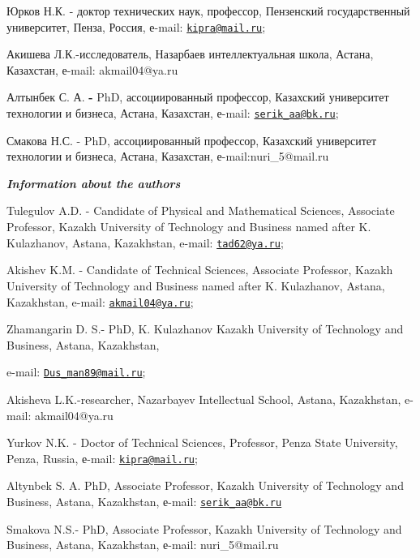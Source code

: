 Юрков Н.К. - доктор технических наук, профессор, Пензенский
государственный университет, Пенза, Россия, е-mail:
\href{mailto:kipra@mail.ru}{\nolinkurl{kipra@mail.ru}};

Акишева Л.К.-исследователь, Назарбаев интеллектуальная школа, Астана,
Казахстан, е-mail: akmail04@ya.ru

Алтынбек С. А. {\bfseries -} PhD, ассоциированный профессор, Казахский
университет технологии и бизнеса, Астана, Казахстан, е-mail:
\href{mailto:serik_aa@bk.ru}{\nolinkurl{serik\_aa@bk.ru}};

Смакова Н.С. - PhD, ассоциированный профессор, Казахский университет
технологии и бизнеса, Астана, Казахстан, е-mail:nuri\_5@mail.ru

\emph{{\bfseries Information about the authors}}

Tulegulov A.D. - Candidate of Physical and Mathematical Sciences,
Associate Professor, Kazakh University of Technology and Business named
after K. Kulazhanov, Astana, Kazakhstan, e-mail:
\href{mailto:tad62@ya.ru}{\nolinkurl{tad62@ya.ru}};

Akishev K.M. - Candidate of Technical Sciences, Associate Professor,
Kazakh University of Technology and Business named after K. Kulazhanov,
Astana, Kazakhstan, e-mail:
\href{mailto:akmail04@ya.ru}{\nolinkurl{akmail04@ya.ru}};

Zhamangarin D. S.- PhD, K. Kulazhanov Kazakh University of Technology
and Business, Astana, Kazakhstan,

e-mail: \href{mailto:Dus_man89@mail.ru}{\nolinkurl{Dus\_man89@mail.ru}};

Akisheva L.K.-researcher, Nazarbayev Intellectual School, Astana,
Kazakhstan, e-mail: akmail04@ya.ru

Yurkov N.K. - Doctor of Technical Sciences, Professor, Penza State
University, Penza, Russia, е-mail:
\href{mailto:kipra@mail.ru}{\nolinkurl{kipra@mail.ru}};

Altynbek S. A. PhD, Associate Professor, Kazakh University of Technology
and Business, Astana, Kazakhstan, е-mail:
\href{mailto:serik_aa@bk.ru}{\nolinkurl{serik\_aa@bk.ru}}

Smakova N.S.- PhD, Associate Professor, Kazakh University of Technology
and Business, Astana, Kazakhstan, е-mail: nuri\_5@mail.ru
